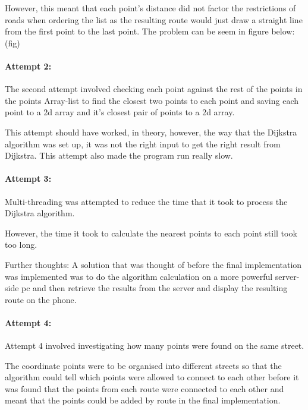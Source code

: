\documentclass[12pt,a4paper]{article}
\newcommand{\figuremacro}[5]{
    \begin{figure}[#1]
        \centering
        \texttt{[image: \#2]}
        \caption[#3]{\textbf{#3}#4}
        \label{fig:#2}
    \end{figure}
}
\begin{document}
However, this meant that each point's distance did not factor the restrictions of roads when ordering the list as the resulting route would just draw a straight line from the first point to the last point. The problem can be seem in figure below:
(fig)


\paragraph{Attempt 2:} 
The second attempt involved checking each point against the rest of the points in the points Array-list to find the closest two points to each point and saving each point to a 2d array and it's closest pair of points to a 2d array.

This attempt should have worked, in theory, however, the way that the Dijkstra algorithm was set up, it was not the right input to get the right result from Dijkstra. This attempt also made the program run really slow.

\paragraph{Attempt 3:}
Multi-threading was attempted to reduce the time that it took to process the Dijkstra algorithm.

However, the time it took to calculate the nearest points to each point still took too long.

Further thoughts: 
A solution that was thought of before the final implementation was implemented was to do the algorithm calculation on a more powerful server-side pc and then retrieve the results from the server and display the resulting route on the phone.


\paragraph{Attempt 4:}
Attempt 4 involved investigating how many points were found on the same street.

The coordinate points were to be organised into different streets so that the algorithm could tell which points were allowed to connect to each other before it was found that the points from each route were connected to each other and meant that the points could be added by route in the final implementation.
\end{document}
